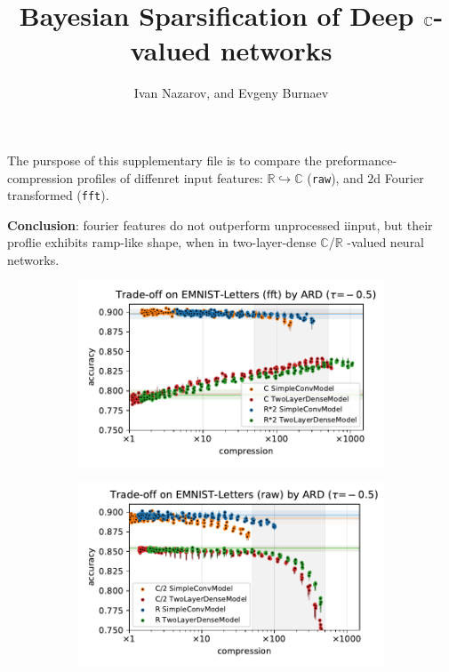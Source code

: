 \documentclass[a4paper,10pt,onecolumn]{article}
\title{Bayesian Sparsification of Deep $\cplx$-valued networks}
\author{Ivan Nazarov, and Evgeny Burnaev}
\newcommand{\real}{\mathbb{R}}
\newcommand{\cplx}{\mathbb{C}}
\begin{document}
\maketitle

The purspose of this supplementary file is to compare the preformance-compression
profiles of diffenret input features: $\real \hookrightarrow \cplx$ (\texttt{raw}),
and $2$d Fourier transformed (\texttt{fft}).

\bigskip
\noindent
\textbf{Conclusion}: fourier features do not outperform unprocessed iinput, but their
proflie exhibits ramp-like shape, when in two-layer-dense $\cplx$/$\real$ -valued
neural networks.

\listoffigures

\clearpage

\begin{figure}[b]
  \centering
  \begin{subfigure}[b]{0.5\columnwidth}
    \centering
    \includegraphics[width=\columnwidth]{figure__mnist-like__trade-off/appendix__cmp__ARD__emnist_letters__fft__-0.5.pdf}
  \end{subfigure}%
  \begin{subfigure}[b]{0.5\columnwidth}
    \centering
    \includegraphics[width=\columnwidth]{figure__mnist-like__trade-off/appendix__cmp__ARD__emnist_letters__raw__-0.5.pdf}

\end{subfigure}
\end{figure}
\end{document}
